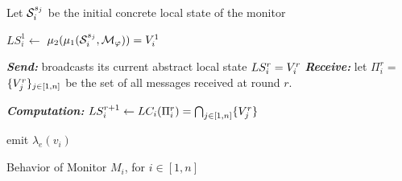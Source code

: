 

\begin{algorithm}[H]

\small
{}
\DontPrintSemicolon
Let $\mathcal{S}_i^{s_j}$ be the initial concrete local state of the monitor  \label{line:init2}

$LS_i^1 \gets$ $\mu_2 (  \mu_1(\mathcal{S}_i^{s_j}, \mathcal{M}_\varphi)) = V_i^1$     \label{line:abst2}

  {   
{\em \textbf{Send:}}  broadcasts its current abstract local state $LS_i^r = V_i^r$ 
\label{line:send2} 
{\em \textbf{Receive:}} let $\Pi_i^r =$ $\{ V_j^r\}_{j \in [1, n]}$ be the set of all messages received at round $r$. \label{line:rec2}

{\it \textbf{Computation:}}  $LS_i^{r+1} \gets LC_i(\Pi_i^r) = \bigcap_{j \in [1, n]} \{V_j^r\}$  \label{line:computation2} 

}
emit $\lambda_e(v_i)$  
\label{line:emit2}
\caption{Behavior of Monitor $M_i$, for $i\in [1, n]$}
\label{alg:localmonalgo2}
\end{algorithm}










